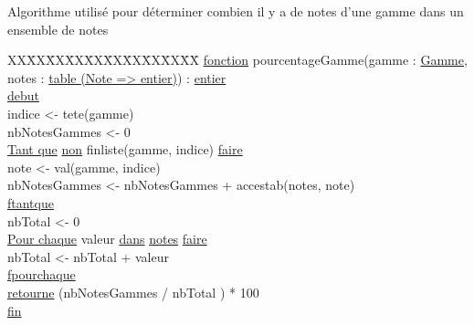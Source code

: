 Algorithme utilisé pour déterminer combien il y a de notes d'une gamme dans un ensemble de notes\newline
\begin{tabbing}
\kill XX\=XX\=XX\=XX\=XX\=XX\=XX\=XX\=XX\=XX\=
\kill
\ul{fonction} pourcentageGamme(gamme : \ul{Gamme}, notes : \ul{table (Note => entier)}) : \ul{entier}\\
\ul{debut}\\
    \>indice <- tete(gamme)\\
    \>nbNotesGammes <- 0\\
    \>\ul{Tant que} \ul{non} finliste(gamme, indice) \ul{faire}\\
        \>\>note <- val(gamme, indice)\\
        \>\>nbNotesGammes <- nbNotesGammes + accestab(notes, note)\\
    \>\ul{ftantque}\\
    \>nbTotal <- 0\\
    \>\ul{Pour chaque} valeur \ul{dans} \ul{notes} \ul{faire}\\
        \>\>nbTotal <- nbTotal + valeur\\
    \>\ul{fpourchaque}\\
    \>\ul{retourne} (nbNotesGammes / nbTotal ) * 100\\
\ul{fin}\\
\end{tabbing}